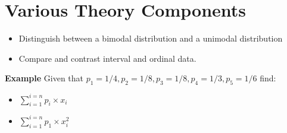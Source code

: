 \documentclass[]{report}
\begin{document}









\section{Various Theory Components}
\begin{itemize}
	\item Distinguish between a bimodal distribution and a unimodal distribution
	\item Compare and contrast interval and ordinal data.
\end{itemize}		




\noindent \textbf{Example}
Given that $p_1= 1/4, p_2= 1/8, p_3= 1/8,p_4= 1/3, p_5 = 1/6$ find:

\begin{itemize}
	\item $\displaystyle\sum_{i=1}^{i=n} p_{i} \times x_{i}$
	\item $\displaystyle\sum_{i=1}^{i=n} p_{1} \times x_{i}^2$
\end{itemize}
\end{document}
